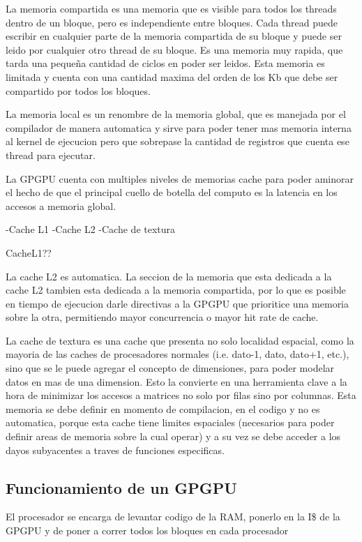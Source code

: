 La memoria compartida es una memoria que es visible para todos los threads dentro
de un bloque, pero es independiente entre bloques. Cada thread puede escribir en cualquier
parte de la memoria compartida de su bloque y puede ser leido por cualquier otro thread
de su bloque. Es una memoria muy rapida, que tarda una peque\~na cantidad de ciclos 
en poder ser leidos. Esta memoria es limitada y cuenta con una cantidad maxima del orden de los
Kb que debe ser compartido por todos los bloques.

La memoria local es un renombre de la memoria global, que es manejada por el compilador
de manera automatica y sirve para poder tener mas memoria interna al kernel de ejecucion
pero que sobrepase la cantidad de registros que cuenta ese thread para ejecutar.

La GPGPU cuenta con multiples niveles de memorias cache para poder aminorar el hecho
de que el principal cuello de botella del computo es la latencia en los accesos a memoria 
global.

-Cache L1
-Cache L2
-Cache de textura

CacheL1??

La cache L2 es automatica. La seccion de la memoria que esta dedicada a la cache L2
tambien esta dedicada a la memoria compartida, por lo que es posible en tiempo de ejecucion
darle directivas a la GPGPU que prioritice una memoria sobre la otra, permitiendo 
mayor concurrencia o mayor hit rate de cache.

La cache de textura es una cache que presenta no solo localidad espacial, como la mayoria
de las caches de procesadores normales (i.e. dato-1, dato, dato+1, etc.), sino que se le
puede agregar el concepto de dimensiones, para poder modelar datos en mas de una dimension.
Esto la convierte en una herramienta clave a la hora de minimizar los accesos a matrices
no solo por filas sino por columnas. Esta memoria se debe definir en momento de compilacion,
en el codigo y no es automatica, porque esta cache tiene limites espaciales (necesarios
para poder definir areas de memoria sobre la cual operar) y a su vez se debe acceder
a los dayos subyacentes a traves de funciones especificas.
 
\subsection{Funcionamiento de un GPGPU}
El procesador se encarga de levantar codigo de la RAM, ponerlo en la I\$ de la GPGPU
y de poner a correr todos los bloques en cada procesador


